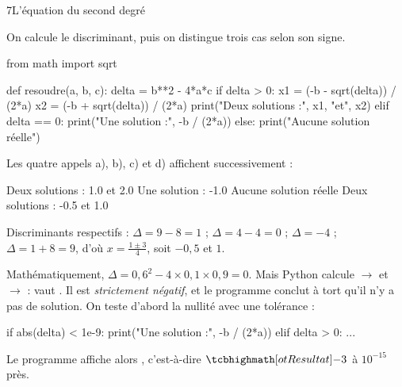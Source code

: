 \begin{corrige}{7}{L'équation du second degré}
\begin{questions}
  \item On calcule le discriminant, puis on distingue trois cas selon son signe.
\begin{python}
from math import sqrt

def resoudre(a, b, c):
    delta = b**2 - 4*a*c
    if delta > 0:
        x1 = (-b - sqrt(delta)) / (2*a)
        x2 = (-b + sqrt(delta)) / (2*a)
        print("Deux solutions :", x1, "et", x2)
    elif delta == 0:
        print("Une solution :", -b / (2*a))
    else:
        print("Aucune solution réelle")
\end{python}
  \item Les quatre appels a), b), c) et d) affichent successivement :
\begin{codecote}[0.5]
\begin{consolecol}
Deux solutions : 1.0 et 2.0
Une solution : -1.0
Aucune solution réelle
Deux solutions : -0.5 et 1.0
\end{consolecol}
\cote
Discriminants respectifs : $\Delta=9-8=1$ ; $\Delta=4-4=0$ ; $\Delta=-4$ ; $\Delta=1+8=9$, d'où $x=\frac{1\pm3}{4}$, soit $-0{,}5$
et $1$.
\end{codecote}
  \item Mathématiquement, $\Delta=0{,}6^{2}-4\times0{,}1\times0{,}9=0$. Mais Python calcule  $\to$  et
     $\to$  :  vaut . Il est \emph{strictement
    négatif}, et le programme conclut à tort qu'il n'y a pas de solution. On teste d'abord la nullité avec une tolérance :
\begin{python}
    if abs(delta) < 1e-9:
        print("Une solution :", -b / (2*a))
    elif delta > 0:
        ...
\end{python}
    Le programme affiche alors , c'est-à-dire $\res{-3}$ à $10^{-15}$ près.
\end{questions}
\end{corrige}


